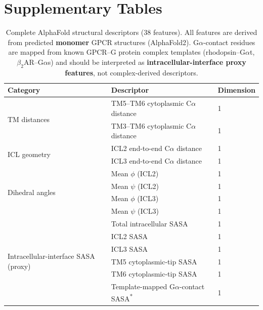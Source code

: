\documentclass[11pt,a4paper]{article}
\title{}
\author{}
\date{}
\begin{document}
\maketitle

\section{Supplementary Tables}

\begin{table}[h!]
\centering
\caption{Complete AlphaFold structural descriptors (38 features). All features are derived from predicted \textbf{monomer} GPCR structures (AlphaFold2). G$\alpha$-contact residues are mapped from known GPCR--G protein complex templates (rhodopsin--G$\alpha$t, $\beta_2$AR--G$\alpha$s) and should be interpreted as \textbf{intracellular-interface proxy features}, not complex-derived descriptors.}
\label{tab:alphafold_features}
\begin{tabular}{lll}
\toprule
Category & Descriptor & Dimension \\
\midrule
\multirow{2}{*}{TM distances} & TM5--TM6 cytoplasmic C$\alpha$ distance & 1 \\
                              & TM3--TM6 cytoplasmic C$\alpha$ distance & 1 \\
\midrule
\multirow{2}{*}{ICL geometry} & ICL2 end-to-end C$\alpha$ distance & 1 \\
                              & ICL3 end-to-end C$\alpha$ distance & 1 \\
\midrule
\multirow{4}{*}{Dihedral angles} & Mean $\phi$ (ICL2) & 1 \\
                                 & Mean $\psi$ (ICL2) & 1 \\
                                 & Mean $\phi$ (ICL3) & 1 \\
                                 & Mean $\psi$ (ICL3) & 1 \\
\midrule
\multirow{6}{*}{Intracellular-interface SASA (proxy)} & Total intracellular SASA & 1 \\
                                & ICL2 SASA & 1 \\
                                & ICL3 SASA & 1 \\
                                & TM5 cytoplasmic-tip SASA & 1 \\
                                & TM6 cytoplasmic-tip SASA & 1 \\
                                & Template-mapped G$\alpha$-contact SASA\textsuperscript{*} & 1 \\

\end{tabular}
\end{table}
\end{document}
